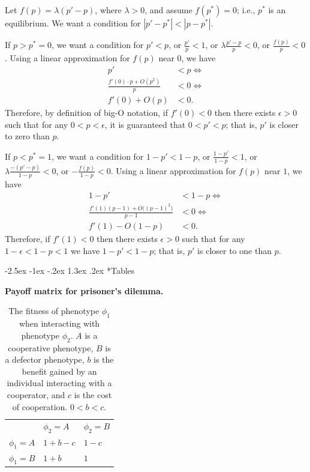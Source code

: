 \documentclass[12pt]{extarticle}
\makeatletter
\renewcommand\section{\@startsection {section}{1}{\z@}%
     {-2.5ex \@plus -1ex \@minus -.2ex}%
     {1.3ex \@plus.2ex}%
    {\Large\bfseries}}
\makeatother
\begin{document}
{\begin{appendices}
Let $f(p)=\lambda(p'-p)$, where $\lambda>0$, and assume $f(p^*)=0$; i.e., $p^*$ is an equilibrium.
We want a condition for $|p'-p^*| < |p-p^*|$.

If $p>p^*=0$, we want a condition for $p'<p$, or
$\frac{p'}{p}<1$, or
$\lambda \frac{p'-p}{p} < 0$, or
$\frac{f(p)}{p} < 0$.
Using a linear approximation for $f(p)$ near $0$, we have
\begin{equation}\begin{aligned}
p' &< p \Leftrightarrow \\
\frac{f'(0) \cdot p + O(p^2)}{p} &< 0 \Leftrightarrow \\
f'(0) + O(p) &< 0.
\end{aligned}\end{equation}
Therefore, by definition of big-O notation, if $f'(0)<0$ then there exists $\epsilon>0$ such that for any $0<p<\epsilon$, it is guaranteed that $0<p'<p$; that is, $p'$ is closer to zero than $p$.

If $p<p^*=1$, we want a condition for $1-p' < 1-p$, or
$\frac{1-p'}{1-p}<1$, or
$\lambda \frac{-(p'-p)}{1-p} < 0$, or
$-\frac{f(p)}{1-p} < 0$.
Using a linear approximation for $f(p)$ near $1$, we have
\begin{equation}\begin{aligned}
1-p' &< 1-p  \Leftrightarrow \\
\frac{f'(1)(p-1) + O\big((p-1)^2\big)}{p-1} &< 0 \Leftrightarrow \\
f'(1) - O(1-p) &< 0.
\end{aligned}\end{equation}
Therefore, if $f'(1)<0$ then there exists $\epsilon>0$ such that for any $1-\epsilon<1-p<1$ we have $1-p'<1-p$; that is, $p'$ is closer to one than $p$.
\end{appendices}






\newpage

\section*{Tables}

\bigskip
\begin{table}[h]
\centering
\caption{\textbf{Payoff matrix for prisoner's dilemma.}}
\begin{tabular}{lll}
\toprule
           & $\phi_2=A$ & $\phi_2=B$ \\ \cmidrule(r){1-3}
$\phi_1=A$ & $1+b-c$ & $1-c$ \\
$\phi_1=B$ & $1+b$   & $1$
\\ \bottomrule
\end{tabular}
\label{table:prisoner_payoff}
\caption*{
The fitness of phenotype $\phi_1$ when interacting with phenotype $\phi_2$. $A$ is a cooperative phenotype, $B$ is a defector phenotype, $b$ is the benefit gained by an individual interacting with a cooperator, and $c$ is the cost of cooperation. $0<b<c$.
}
\end{table}
\bigskip

}
\end{document}
